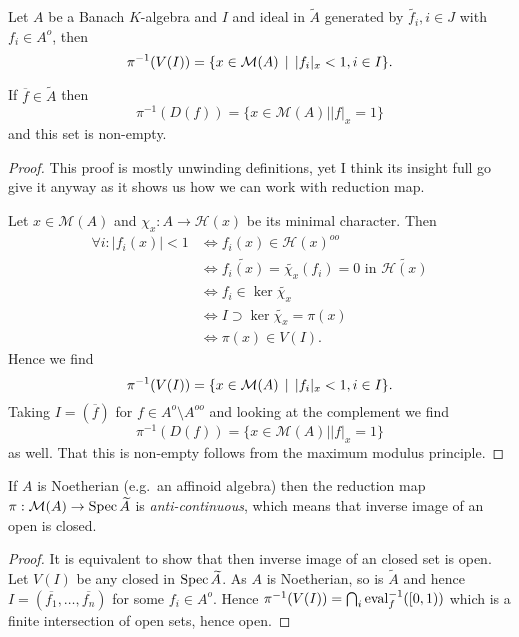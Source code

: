\begin{lemma}
	Let $A$ be a Banach $K$-algebra and $I$ and ideal in $\widetilde A$ generated by $\widetilde{f_i}, i \in J$ with  $f_i \in A^{o}$, then 
	\[
		\pi^{-1}(V(I)) = \{x \in \mathcal{M} (A) \st |f_i|_x< 1, i \in I\} 
	.\] 

	If $\overline{f} \in \widetilde A$ then \[
		\pi^{-1}(D(f)) = \{x \in \mathcal{M}(A) | |f|_x = 1 \} 
	\] 
	and this set is non-empty. 
\end{lemma}
\begin{proof}
	This proof is mostly unwinding definitions, yet I think its insight full go give it anyway as it shows us how we can work with reduction map. 

	Let $x \in \mathcal{M} (A)$ and $\chi_x: A \to \mathcal{H} (x)$ be its minimal character. 
	Then 
	\begin{align*}
		\forall i: |f_i(x)| < 1 &\iff f_i(x) \in \mathcal{H}(x)^{oo}\\
					&\iff \widetilde{f_i(x) } = \widetilde{\chi_x}(f_i) = 0 \text{ in } \widetilde{\mathcal{H} (x)}\\
					&\iff f_i \in  \ker \widetilde{\chi_x} \\
					&\iff I \supset \ker \widetilde{\chi_x} = \pi(x)\\
					&\iff \pi(x) \in V(I)
	.\end{align*}
	Hence we find \[
		\pi^{-1}(V(I)) = \{x \in \mathcal{M} (A) \st |f_i|_x< 1, i \in I\} 
	.\] 
	Taking $I = (\overline{f})$ for $f \in A^{o} \setminus A^{oo}$ and looking at the complement we find \[
		\pi^{-1}(D(f)) = \{x \in \mathcal{M}(A) | |f|_x = 1 \} 
	\] 
	as well. 
	That this is non-empty follows from the maximum modulus principle. 


\end{proof}

\begin{corollary}
	If $A$ is Noetherian (e.g.\ an affinoid algebra) then
	the reduction map $\pi: \mathcal{M} (A) \to \operatorname{Spec} \widetilde A$ is \emph{anti-continuous}, which means that inverse image of an open is closed. 
\end{corollary}
\begin{proof}
	It is equivalent to show that then inverse image of an closed set is open.
	Let $V(I)$ be any closed in $\operatorname{Spec} \widetilde A$.
	As $A$ is Noetherian, so is $\widetilde A$ and hence $I = (\overline{f_1}, \ldots, \overline{f_n})$ for some $f_i \in A^{o}$.  
	Hence $\pi^{-1}(V(I)) = \bigcap_{i} \operatorname{eval}_f^{-1}([0, 1))$ which is a finite intersection of open sets, hence open. 
\end{proof}


